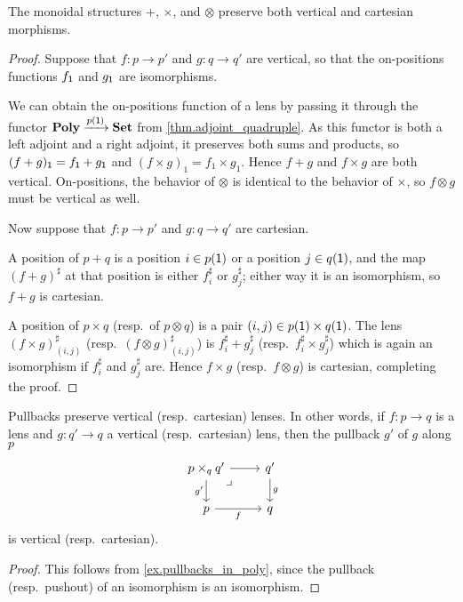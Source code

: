 \documentclass[Book-Poly]{subfiles}
\begin{document}
\begin{proposition}\label{prop.monoidal_pres_vert_cart}
The monoidal structures $+$, $\times$, and $\otimes$ preserve both vertical and cartesian morphisms.
\end{proposition}
\begin{proof}
Suppose that $f\colon p\to p'$ and $g\colon q\to q'$ are vertical, so that the on-positions functions $f_{\textsf{1}}$ and $g_{\textsf{1}}$ are isomorphisms.

We can obtain the on-positions function of a lens by passing it through the functor $\mathbf{Poly}\xrightarrow{p(\textsf{1})}\mathbf{Set}$ from \cref{thm.adjoint_quadruple}.
As this functor is both a left adjoint and a right adjoint, it preserves both sums and products, so $(f+g)_{\textsf{1}} = f_{\textsf{1}}+g_{\textsf{1}}$ and $(f\times g)_1 = f_1\times g_1$.
Hence $f+g$ and $f\times g$ are both vertical.
On-positions, the behavior of $\otimes$ is identical to the behavior of $\times$, so $f\otimes g$ must be vertical as well.

Now suppose that $f\colon p\to p'$ and $g\colon q\to q'$ are cartesian.

A position of $p+q$ is a position $i\in p(\textsf{1})$ or a position $j\in q(\textsf{1})$, and the map $(f+g)^\sharp$ at that position is either $f^\sharp_i$ or $g^\sharp_j$; either way it is an isomorphism, so $f+g$ is cartesian.

A position of $p\times q$ (resp.\ of $p\otimes q$) is a pair $(i,j)\in p(\textsf{1})\times q(\textsf{1})$. The lens $(f\times g)^\sharp_{(i,j)}$ (resp.\ $(f\otimes g)^\sharp_{(i,j)}$) is $f^\sharp_i+g^\sharp_j$ (resp.\ $f^\sharp_i\times g^\sharp_j$) which is again an isomorphism if $f^\sharp_i$ and $g^\sharp_j$ are. Hence $f\times g$ (resp.\ $f\otimes g$) is cartesian, completing the proof.
\end{proof}

\begin{proposition}\label{prop.pullback_vert_cart}
Pullbacks preserve vertical (resp.\ cartesian) lenses.
In other words, if $f\colon p\to q$ is a lens and $g\colon q'\to q$ a vertical (resp.\ cartesian) lens, then the pullback $g'$ of $g$ along $p$
\[
\begin{tikzcd}
	p\times_qq'\ar[r]\ar[d, "g'"']&
	q'\ar[d, "g"]\\
	p\ar[r, "f"']&
	q\ar[ul, phantom, very near end, "\lrcorner"]
\end{tikzcd}
\]
is vertical (resp.\ cartesian).
\end{proposition}
\begin{proof}
This follows from \cref{ex.pullbacks_in_poly}, since the pullback (resp.\ pushout) of an isomorphism is an isomorphism.
\end{proof}
\end{document}
